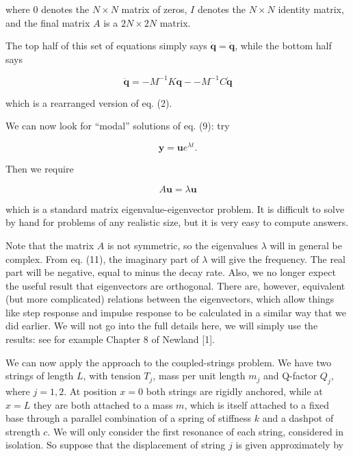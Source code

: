   \noindent{}where $0$ denotes the $N \times N$ matrix of zeros, $I$ denotes 
  the $N \times N$ identity matrix, and the final matrix $A$ is a $2N \times 
  2N$ matrix. 

  The top half of this set of equations simply says 
  $\dot{\mathbf{q}}=\dot{\mathbf{q}}$, while the bottom half says 

  \begin{equation*}\ddot{\mathbf{q}} = -M^{-1} K \mathbf{q} -- M^{-1} C 
  \dot{\mathbf{q}} \tag{10}\end{equation*} 

  \noindent{}which is a rearranged version of eq. (2). 

  We can now look for ``modal'' solutions of eq. (9): try 

  \begin{equation*}\mathbf{y} = \mathbf{u} e^{\lambda t} . 
  \tag{11}\end{equation*} 

  Then we require 

  \begin{equation*}A \mathbf{u} = \lambda \mathbf{u} \tag{12}\end{equation*} 

  \noindent{}which is a standard matrix eigenvalue-eigenvector problem. It is 
  difficult to solve by hand for problems of any realistic size, but it is very 
  easy to compute answers. 

  Note that the matrix $A$ is not symmetric, so the eigenvalues $\lambda$ will 
  in general be complex. From eq. (11), the imaginary part of $\lambda$ will 
  give the frequency. The real part will be negative, equal to minus the decay 
  rate. Also, we no longer expect the useful result that eigenvectors are 
  orthogonal. There are, however, equivalent (but more complicated) relations 
  between the eigenvectors, which allow things like step response and impulse 
  response to be calculated in a similar way that we did earlier. We will not 
  go into the full details here, we will simply use the results: see for 
  example Chapter 8 of Newland [1]. 

  We can now apply the approach to the coupled-strings problem. We have two 
  strings of length $L$, with tension $T_j$, mass per unit length $m_j$ and 
  Q-factor $Q_j$, where $j=1,2$. At position $x=0$ both strings are rigidly 
  anchored, while at $x=L$ they are both attached to a mass $m$, which is 
  itself attached to a fixed base through a parallel combination of a spring of 
  stiffness $k$ and a dashpot of strength $c$. We will only consider the first 
  resonance of each string, considered in isolation. So suppose that the 
  displacement of string $j$ is given approximately by 

